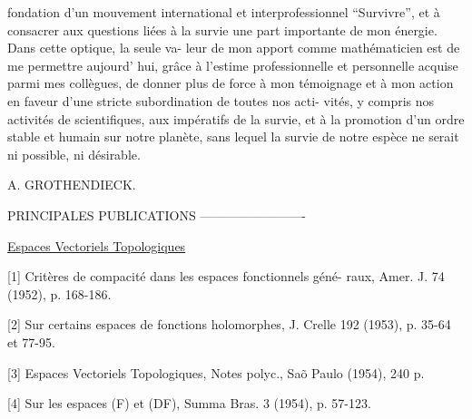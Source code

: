 
fondation d'un mouvement international et interprofessionnel
``Survivre'', et à consacrer aux questions liées à la survie une
part importante de mon énergie. Dans cette optique, la seule va-%
leur de mon apport comme mathématicien est de me permettre aujourd'%
hui, grâce à l'estime professionnelle et personnelle acquise parmi
mes collègues, de donner plus de force à mon témoignage et à mon
action en faveur d'une stricte subordination de toutes nos acti-%
vités, y compris nos activités de scientifiques, aux impératifs
de la survie, et à la promotion d'un ordre stable et humain sur
notre planète, sans lequel la survie de notre espèce ne serait
ni possible, ni désirable.

A. GROTHENDIECK.

PRINCIPALES PUBLICATIONS
-------------------------

\uline{Espaces Vectoriels Topologiques}

[1] Critères de compacité dans les espaces fonctionnels géné-%
raux, Amer. J. 74 (1952), p. 168-186.

[2] Sur certains espaces de fonctions holomorphes, J. Crelle
192 (1953), p. 35-64 et 77-95.

[3] Espaces Vectoriels Topologiques, Notes polyc., Sa\~o Paulo
(1954), 240 p.

[4] Sur les espaces (F) et (DF), Summa Bras. 3 (1954),
p. 57-123.

